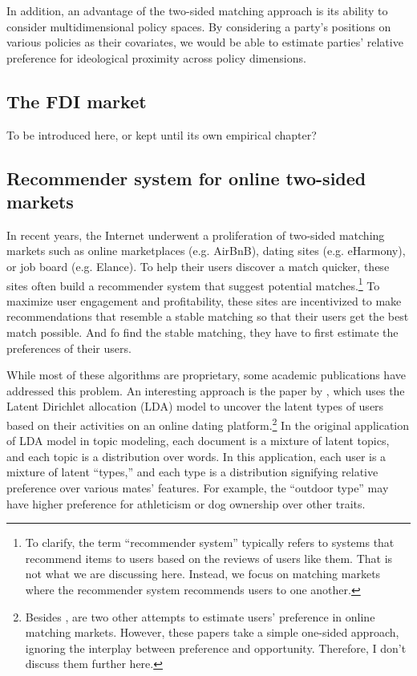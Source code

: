 In addition, an advantage of the two-sided matching approach is its ability to
consider multidimensional policy spaces. By considering a party's positions on
various policies as their covariates, we would be able to estimate parties'
relative preference for ideological proximity across policy dimensions.

\subsection{The FDI market}

To be introduced here, or kept until its own empirical chapter?

\subsection{Recommender system for online two-sided markets}

In recent years, the Internet underwent a proliferation of two-sided matching
markets such as online marketplaces (e.g. AirBnB), dating sites (e.g. eHarmony),
or job board (e.g. Elance). To help their users discover a match quicker, these
sites often build a recommender system that suggest potential
matches.\footnote{To clarify, the term ``recommender system'' typically refers
  to systems that recommend items to users based on the reviews of users like
  them. That is not what we are discussing here. Instead, we focus on matching
  markets where the recommender system recommends users to one another.} To
maximize user engagement and profitability, these sites are incentivized to make
recommendations that resemble a stable matching so that their users get the best
match possible. And fo find the stable matching, they have to first estimate the preferences
of their users.

While most of these algorithms are proprietary, some academic publications have
addressed this problem. An interesting approach is the paper by \citet{Tu2014}, which uses the
Latent Dirichlet allocation (LDA) model to uncover the latent types of users
based on their activities on an online dating platform.\footnote{Besides
  \citet{Tu2014}, \citet{Hitsch2010, Goswami2014} are two other attempts to
  estimate users' preference in online matching markets. However, these papers
  take a simple one-sided approach, ignoring the interplay between preference
  and opportunity. Therefore, I don't discuss them further here.} In the
original application of LDA model in topic modeling, each document is a mixture
of latent topics, and each topic is a distribution over words. In this
application, each user is a mixture of latent ``types,'' and each type is a
distribution signifying relative preference over various mates' features. For
example, the ``outdoor type'' may have higher preference for athleticism or dog
ownership over other traits.

